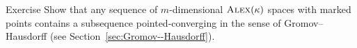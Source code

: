 \begin{thm}{Exercise}\label{ex:diam-compact:GH}
Show that any sequence of $m$-dimensional $\textsc{Alex}(\kappa)$ spaces with marked points contains a subsequence pointed-converging in the sense of Gromov--Hausdorff (see Section~\ref{sec:Gromov--Hausdorff}).

\end{thm}
